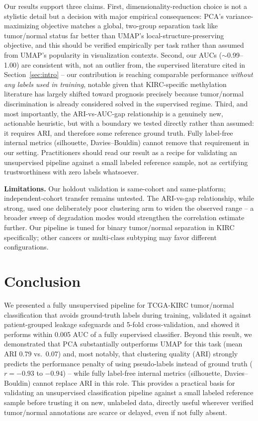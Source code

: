 \documentclass[sigconf]{acmart}
\begin{document}
Our results support three claims. First, dimensionality-reduction choice is not a stylistic detail but a decision with major empirical consequences: PCA's variance-maximizing objective matches a global, two-group separation task like tumor/normal status far better than UMAP's local-structure-preserving objective, and this should be verified empirically per task rather than assumed from UMAP's popularity in visualization contexts. Second, our AUCs ($\sim$0.99--1.00) are consistent with, not an outlier from, the supervised literature cited in Section~\ref{sec:intro} \cite{ding2019integrative, liu2019dna} -- our contribution is reaching comparable performance \emph{without any labels used in training}, notable given that KIRC-specific methylation literature has largely shifted toward prognosis \cite{tang2020novel} precisely because tumor/normal discrimination is already considered solved in the supervised regime. Third, and most importantly, the ARI-vs-AUC-gap relationship is a genuinely new, actionable heuristic, but with a boundary we tested directly rather than assumed: it requires ARI, and therefore some reference ground truth. Fully label-free internal metrics (silhouette, Davies--Bouldin) cannot remove that requirement in our setting. Practitioners should read our result as a recipe for validating an unsupervised pipeline against a small labeled reference sample, not as certifying trustworthiness with zero labels whatsoever.

\textbf{Limitations.} Our holdout validation is same-cohort and same-platform; independent-cohort transfer remains untested. The ARI-vs-gap relationship, while strong, used one deliberately poor clustering arm to widen the observed range -- a broader sweep of degradation modes would strengthen the correlation estimate further. Our pipeline is tuned for binary tumor/normal separation in KIRC specifically; other cancers or multi-class subtyping may favor different configurations.

\section{Conclusion}
We presented a fully unsupervised pipeline for TCGA-KIRC tumor/normal classification that avoids ground-truth labels during training, validated it against patient-grouped leakage safeguards and 5-fold cross-validation, and showed it performs within 0.005 AUC of a fully supervised classifier. Beyond this result, we demonstrated that PCA substantially outperforms UMAP for this task (mean ARI 0.79 vs.\ 0.07) and, most notably, that clustering quality (ARI) strongly predicts the performance penalty of using pseudo-labels instead of ground truth ($r=-0.93$ to $-0.94$) -- while fully label-free internal metrics (silhouette, Davies--Bouldin) cannot replace ARI in this role. This provides a practical basis for validating an unsupervised classification pipeline against a small labeled reference sample before trusting it on new, unlabeled data, directly useful wherever verified tumor/normal annotations are scarce or delayed, even if not fully absent.
\end{document}
